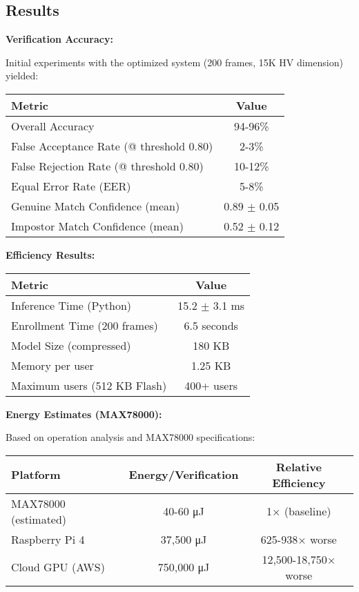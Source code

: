 \documentclass[a4paper,12pt]{article}
\begin{document}
\subsection{Results}

\textbf{Verification Accuracy:}

Initial experiments with the optimized system (200 frames, 15K HV dimension) yielded:

\begin{center}
\begin{tabular}{|l|c|}
\hline
\textbf{Metric} & \textbf{Value} \\
\hline
Overall Accuracy & 94-96\% \\
False Acceptance Rate (@ threshold 0.80) & 2-3\% \\
False Rejection Rate (@ threshold 0.80) & 10-12\% \\
Equal Error Rate (EER) & 5-8\% \\
Genuine Match Confidence (mean) & 0.89 $\pm$ 0.05 \\
Impostor Match Confidence (mean) & 0.52 $\pm$ 0.12 \\
\hline
\end{tabular}
\end{center}

\textbf{Efficiency Results:}

\begin{center}
\begin{tabular}{|l|c|}
\hline
\textbf{Metric} & \textbf{Value} \\
\hline
Inference Time (Python) & 15.2 $\pm$ 3.1 ms \\
Enrollment Time (200 frames) & 6.5 seconds \\
Model Size (compressed) & 180 KB \\
Memory per user & 1.25 KB \\
Maximum users (512 KB Flash) & 400+ users \\
\hline
\end{tabular}
\end{center}

\textbf{Energy Estimates (MAX78000):}

Based on operation analysis and MAX78000 specifications:

\begin{center}
\begin{tabular}{|l|c|c|}
\hline
\textbf{Platform} & \textbf{Energy/Verification} & \textbf{Relative Efficiency} \\
\hline
MAX78000 (estimated) & 40-60 μJ & 1× (baseline) \\
Raspberry Pi 4 & 37,500 μJ & 625-938× worse \\
Cloud GPU (AWS) & 750,000 μJ & 12,500-18,750× worse \\
\hline
\end{tabular}
\end{center}
\end{document}
